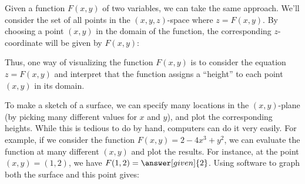 \documentclass{ximera}
\begin{document}
Given a function $F(x,y)$ of two variables, we can take the same
approach.  We'll consider the set of all points in the $(x,y,z)$-space
where $z=F(x,y)$.  By choosing a point $(x,y)$ in the domain of the
function, the corresponding $z$-coordinate will be given by $F(x,y)$:
\begin{image}
\end{image}

Thus, one way of visualizing the function $F(x,y)$ is to consider the
equation $z=F(x,y)$ and interpret that the function assigns a
``height'' to each point $(x,y)$ in its domain.

To make a sketch of a surface, we can specify many locations in the
$(x,y)$-plane (by picking many different values for $x$ and $y$), and
plot the corresponding heights.  While this is tedious to do by hand,
computers can do it very easily.  For example, if we consider the
function $F(x,y) = 2-4x^3+y^2$, we can evaluate the function at many
different $(x,y)$ and plot the results.  For instance, at the point
$(x,y)=(1,2)$, we have $F(1,2) = \answer[given]{2}$.  Using software
to graph both the surface and this point gives:
\end{document}
